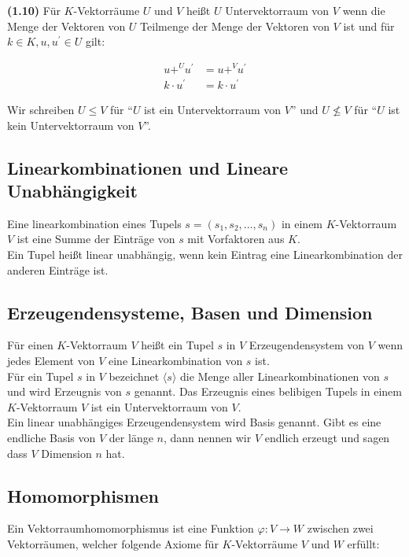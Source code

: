 \documentclass[11pt]{scrartcl}
\newlength{\hangwidth}
\newcommand{\skript}[1]{\settowidth{\hangwidth}{\textbf{(#1)} }\hangpara{\hangwidth}{1}\textbf{(#1)} }
\begin{document}
\skript{1.10} Für $K$-Vektorräume $U$ und $V$ heißt $U$ Untervektorraum von $V$ wenn die Menge der Vektoren von $U$ Teilmenge der Menge der Vektoren von $V$ ist und für $k \in K, u,u^\prime \in U$ gilt:

\begin{align*}
	u {+}^{U} u^\prime &= u {+}^{V} u^\prime	\\
	k \cdot u^\prime &= k \cdot u^\prime
\end{align*}

Wir schreiben $U \leq V$ für ``$U$ ist ein Untervektorraum von $V$'' und $U \nleq V$ für ``$U$ ist kein Untervektorraum von $V$''.

\subsection{Linearkombinationen und Lineare Unabhängigkeit}

Eine linearkombination eines Tupels $s = (s_1,s_2, \ldots, s_n)$ in einem $K$-Vektorraum $V$ ist eine Summe der Einträge von $s$ mit Vorfaktoren aus $K$.	\\
Ein Tupel heißt linear unabhängig, wenn kein Eintrag eine Linearkombination der anderen Einträge ist.

\subsection{Erzeugendensysteme, Basen und Dimension}

Für einen $K$-Vektorraum $V$ heißt ein Tupel $s$ in $V$ Erzeugendensystem von $V$ wenn jedes Element von $V$ eine Linearkombination von $s$ ist.	\\
Für ein Tupel $s$ in $V$ bezeichnet $\langle s \rangle$ die Menge aller Linearkombinationen von $s$ und wird Erzeugnis von $s$ genannt. Das Erzeugnis eines belibigen Tupels in einem $K$-Vektorraum $V$ ist ein Untervektorraum von $V$.	\\
Ein linear unabhängiges Erzeugendensystem wird Basis genannt. Gibt es eine endliche Basis von $V$ der länge $n$, dann nennen wir $V$ endlich erzeugt und sagen dass $V$ Dimension $n$ hat.

\subsection{Homomorphismen}

Ein Vektorraumhomomorphismus ist eine Funktion $\varphi : V \to W$ zwischen zwei Vektorräumen, welcher folgende Axiome für $K$-Vektorräume $V$ und $W$ erfüllt:
\end{document}
